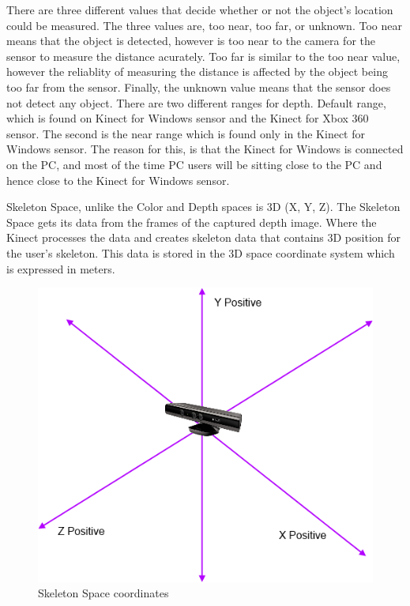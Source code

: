 There are three different values that decide whether or not the object's location could be measured. The three values are, too near, too far, or unknown. Too near means that the object is detected, however is too near to the camera for the sensor to measure the distance acurately. Too far is similar to the too near value, however the reliablity of measuring the distance is affected by the object being too far from the sensor. Finally, the unknown value means that the sensor does not detect any object. There are two different ranges for depth. Default range, which is found on Kinect for Windows sensor and the Kinect for Xbox 360 sensor. The second is the near range which is found only in the Kinect for Windows sensor. The reason for this, is that the Kinect for Windows is connected on the PC, and most of the time PC users will be sitting close to the PC and hence close to the Kinect for Windows sensor.


Skeleton Space, unlike the Color and Depth spaces is 3D (X, Y, Z). The Skeleton Space gets its data from the frames of the captured depth image. Where the Kinect processes the data and creates skeleton data that contains 3D position for the user's skeleton. This data is stored in the 3D space coordinate system which is expressed in meters.

\begin{figure}[!htbp]
\centering
\includegraphics{images/skeletoncoord.png}
\caption{Skeleton Space coordinates}
\label{skeletoncoord}
\end{figure}

